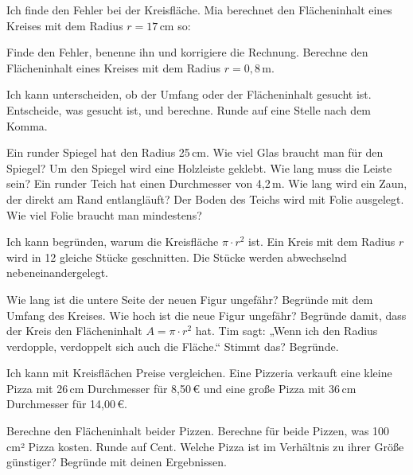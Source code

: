 \begin{aufgabe}{Ich finde den Fehler bei der Kreisfläche. Mia berechnet den Flächeninhalt eines Kreises mit dem Radius $r = 17$\,cm so:}
\begin{teile}
\teil Finde den Fehler, benenne ihn und korrigiere die Rechnung.
\teil Berechne den Flächeninhalt eines Kreises mit dem Radius $r = 0{,}8$\,m.
\end{teile}
\end{aufgabe}

\begin{aufgabe}{Ich kann unterscheiden, ob der Umfang oder der Flächeninhalt gesucht ist. Entscheide, was gesucht ist, und berechne. Runde auf eine Stelle nach dem Komma.}
\begin{teile}
\teil Ein runder Spiegel hat den Radius 25\,cm. Wie viel Glas braucht man für den Spiegel?
\teil Um den Spiegel wird eine Holzleiste geklebt. Wie lang muss die Leiste sein?
\teil Ein runder Teich hat einen Durchmesser von 4,2\,m. Wie lang wird ein Zaun, der direkt am Rand entlangläuft?
\teil Der Boden des Teichs wird mit Folie ausgelegt. Wie viel Folie braucht man mindestens?
\end{teile}
\end{aufgabe}

\begin{aufgabe}{Ich kann begründen, warum die Kreisfläche $\pi \cdot r^2$ ist. Ein Kreis mit dem Radius $r$ wird in 12 gleiche Stücke geschnitten. Die Stücke werden abwechselnd nebeneinandergelegt.}
\begin{minipage}[c]{4.5cm}\tortenkreis\end{minipage}\hspace{1cm}\begin{minipage}[c]{8cm}\tortenrechteck\end{minipage}

\begin{teile}
\teil Wie lang ist die untere Seite der neuen Figur ungefähr? Begründe mit dem Umfang des Kreises.
\teil Wie hoch ist die neue Figur ungefähr?
\teil Begründe damit, dass der Kreis den Flächeninhalt $A = \pi \cdot r^2$ hat.
\teil Tim sagt: „Wenn ich den Radius verdopple, verdoppelt sich auch die Fläche.“ Stimmt das? Begründe.
\end{teile}
\end{aufgabe}

\begin{aufgabe}{Ich kann mit Kreisflächen Preise vergleichen. Eine Pizzeria verkauft eine kleine Pizza mit 26\,cm Durchmesser für 8,50\,€ und eine große Pizza mit 36\,cm Durchmesser für 14,00\,€.}
\begin{teile}
\teil Berechne den Flächeninhalt beider Pizzen.
\teil Berechne für beide Pizzen, was 100\,cm² Pizza kosten. Runde auf Cent.
\teil Welche Pizza ist im Verhältnis zu ihrer Größe günstiger? Begründe mit deinen Ergebnissen.
\end{teile}
\end{aufgabe}
